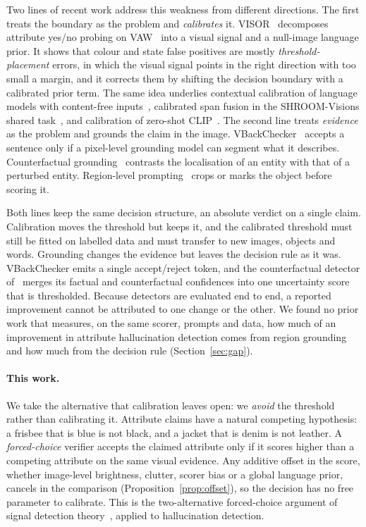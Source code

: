 \documentclass[11pt]{article}
\begin{document}
Two lines of recent work address this weakness from different directions. The first treats the boundary as the problem and \emph{calibrates} it. VISOR~\cite{zhang2026visor} decomposes attribute yes/no probing on VAW~\cite{pham2021vaw} into a visual signal and a null-image language prior. It shows that colour and state false positives are mostly \emph{threshold-placement} errors, in which the visual signal points in the right direction with too small a margin, and it corrects them by shifting the decision boundary with a calibrated prior term. The same idea underlies contextual calibration of language models with content-free inputs~\cite{zhao2021calibrate,fei2023labelbias}, calibrated span fusion in the SHROOM-Visions shared task~\cite{abebe2026spancalib}, and calibration of zero-shot CLIP~\cite{levine2023clipcalib}. The second line treats \emph{evidence} as the problem and grounds the claim in the image. VBackChecker~\cite{guo2026vbackchecker} accepts a sentence only if a pixel-level grounding model can segment what it describes. Counterfactual grounding~\cite{song2026countervhd} contrasts the localisation of an entity with that of a perturbed entity. Region-level prompting~\cite{subramanian2022reclip,shtedritski2023redcircle} crops or marks the object before scoring it.

Both lines keep the same decision structure, an absolute verdict on a single claim. Calibration moves the threshold but keeps it, and the calibrated threshold must still be fitted on labelled data and must transfer to new images, objects and words. Grounding changes the evidence but leaves the decision rule as it was. VBackChecker emits a single accept/reject token, and the counterfactual detector of~\cite{song2026countervhd} merges its factual and counterfactual confidences into one uncertainty score that is thresholded. Because detectors are evaluated end to end, a reported improvement cannot be attributed to one change or the other. We found no prior work that measures, on the same scorer, prompts and data, how much of an improvement in attribute hallucination detection comes from region grounding and how much from the decision rule (Section~\ref{sec:gap}).

\paragraph{This work.} We take the alternative that calibration leaves open: we \emph{avoid} the threshold rather than calibrating it. Attribute claims have a natural competing hypothesis: a frisbee that is blue is not black, and a jacket that is denim is not leather. A \emph{forced-choice} verifier accepts the claimed attribute only if it scores higher than a competing attribute on the same visual evidence. Any additive offset in the score, whether image-level brightness, clutter, scorer bias or a global language prior, cancels in the comparison (Proposition~\ref{prop:offset}), so the decision has no free parameter to calibrate. This is the two-alternative forced-choice argument of signal detection theory~\cite{green1966sdt,macmillan2005detection}, applied to hallucination detection.
\end{document}
